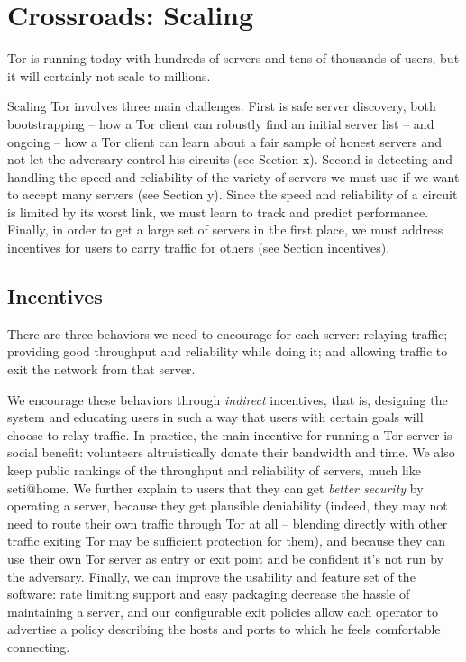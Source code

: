\documentclass{llncs}
\begin{document}
\section{Crossroads: Scaling}

Tor is running today with hundreds of servers and tens of thousands of
users, but it will certainly not scale to millions.

Scaling Tor involves three main challenges.  First is safe server
discovery, both bootstrapping -- how a Tor client can robustly find an
initial server list -- and ongoing -- how a Tor client can learn about
a fair sample of honest servers and not let the adversary control his
circuits (see Section x).  Second is detecting and handling the speed
and reliability of the variety of servers we must use if we want to
accept many servers (see Section y).
Since the speed and reliability of a circuit is limited by its worst link,
we must learn to track and predict performance.  Finally, in order to get
a large set of servers in the first place, we must address incentives
for users to carry traffic for others (see Section incentives).

\subsection{Incentives}

There are three behaviors we need to encourage for each server: relaying
traffic; providing good throughput and reliability while doing it;
and allowing traffic to exit the network from that server.

We encourage these behaviors through \emph{indirect} incentives, that
is, designing the system and educating users in such a way that users
with certain goals will choose to relay traffic.  In practice, the
main incentive for running a Tor server is social benefit: volunteers
altruistically donate their bandwidth and time.  We also keep public
rankings of the throughput and reliability of servers, much like
seti@home.  We further explain to users that they can get \emph{better
security} by operating a server, because they get plausible deniability
(indeed, they may not need to route their own traffic through Tor at all
-- blending directly with other traffic exiting Tor may be sufficient
protection for them), and because they can use their own Tor server
as entry or exit point and be confident it's not run by the adversary.
Finally, we can improve the usability and feature set of the software:
rate limiting support and easy packaging decrease the hassle of
maintaining a server, and our configurable exit policies allow each
operator to advertise a policy describing the hosts and ports to which
he feels comfortable connecting.
\end{document}

